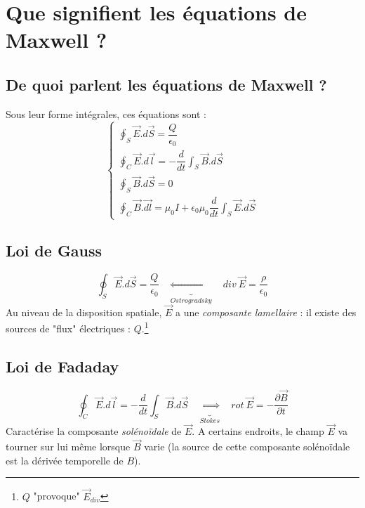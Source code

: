 \documentclass[british,french,11pt, a4paper, openany]{book}
\begin{document}
		
		
		\section{Que signifient les équations de Maxwell ?}
		\subsection{De quoi parlent les équations de Maxwell ?}
		Sous leur forme intégrales, ces équations sont :
		\begin{equation}
		\left\{\begin{array}{l}
		\oint_S \vec{E}.d\vec{S} = \dfrac{Q}{\epsilon_0}\\
		\oint_C \vec{E}.d\vec{l} = -\dfrac{d}{dt}\int_S \vec{B}.d\vec{S}\\
		\oint_S \vec{B}.d\vec{S} = 0\\
		\oint_C \vec{B}.\vec{dl} = \mu_0 I + \epsilon_0\mu_0\dfrac{d}{dt}\int_S \vec{E}.d\vec{S}
		\end{array}\right.
		\end{equation}
		
		\subsection{Loi de Gauss}
		\begin{equation}
		\oint_S \vec{E}.d\vec{S} = \frac{Q}{\epsilon_0}\ \ \ \ \underbrace{\Leftrightarrow}_{Ostrogradsky}\ \ \ \ div\ \vec{E} = \frac{\rho}{\epsilon_0}
		\end{equation}
		Au niveau de la disposition spatiale, $\vec{E}$ a une \textit{composante lamellaire} : il existe des sources de "flux" électriques : $Q$.\footnote{$Q$ "provoque" $\vec{E}_{div}$}\\
		
		\subsection{Loi de Fadaday}
		\begin{equation}
		\oint_C \vec{E}.d\vec{l} = -\dfrac{d}{dt}\int_S \vec{B}.d\vec{S}\ \ \ \ \underbrace{\Leftrightarrow}_{Stokes}\ \ \ \ rot\ \vec{E} = - \dfrac{\partial \vec{B}}{\partial t}
		\end{equation}
		Caractérise la composante \textit{solénoïdale} de $\vec{E}$. A certains endroits, le champ $\vec{E}$ va tourner sur lui même lorsque $\vec{B}$ varie (la source de cette composante solénoïdale est la dérivée temporelle de $B$).\\
		
\end{document}
